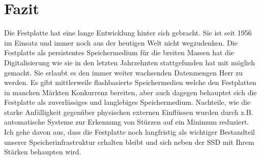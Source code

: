 \documentclass[a4paper, DIV20, 12pt, headsepline, parskip, flushleft]{scrartcl}
\begin{document}
\section{Fazit}
Die Festplatte hat eine lange Entwicklung hinter sich gebracht. Sie ist seit 1956 im Einsatz und immer noch aus der heutigen Welt nicht wegzudenken. Die Festplatte als persistentes Speichermedium für die breiten Massen hat die Digitalisierung wie sie in den letzten Jahrzehnten stattgefunden hat mit möglich gemacht. \newline
Sie erlaubt es den immer weiter wachsenden Datenmengen Herr zu werden. 
Es gibt mittlerweile flashbasierte Speichermedien welche den Festplatten in manchen Märkten Konkurrenz bereiten, aber auch dagegen behauptet sich die Festplatte als zuverlässiges und langlebiges Speichermedium. Nachteile, wie die starke Anfälligkeit gegenüber physischen externen Einflüssen wurden durch z.B. automatische Systeme zur Erkennung von Stürzen auf ein Minimum reduziert.\newline
Ich gehe davon aus, dass die Festplatte noch langfristig als wichtiger Bestandteil unserer Speicherinfrastruktur erhalten bleibt und sich neben der SSD mit Ihrem Stärken behaupten wird.
\newpage
\printbibliography[
heading=bibintoc,
title={Literatur- und Quellenverzeichnis}
]
\end{document}
